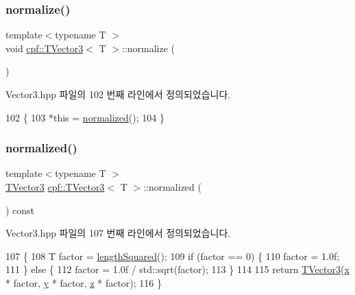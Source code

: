\subsubsection{\texorpdfstring{normalize()}{normalize()}}
{\footnotesize\ttfamily template$<$typename T $>$ \\
void \hyperlink{classcpf_1_1_t_vector3}{cpf\+::\+T\+Vector3}$<$ T $>$\+::normalize (\begin{DoxyParamCaption}{ }\end{DoxyParamCaption})\hspace{0.3cm}{\ttfamily [inline]}}



Vector3.\+hpp 파일의 102 번째 라인에서 정의되었습니다.


\begin{DoxyCode}
102                          \{
103             *\textcolor{keyword}{this} = \hyperlink{classcpf_1_1_t_vector3_a85ded1a6a9844a51b0bb5fe803857a7e}{normalized}();
104         \}
\end{DoxyCode}
\mbox{\label{classcpf_1_1_t_vector3_a85ded1a6a9844a51b0bb5fe803857a7e}} 
\subsubsection{\texorpdfstring{normalized()}{normalized()}}
{\footnotesize\ttfamily template$<$typename T $>$ \\
\hyperlink{classcpf_1_1_t_vector3}{T\+Vector3} \hyperlink{classcpf_1_1_t_vector3}{cpf\+::\+T\+Vector3}$<$ T $>$\+::normalized (\begin{DoxyParamCaption}{ }\end{DoxyParamCaption}) const\hspace{0.3cm}{\ttfamily [inline]}}



Vector3.\+hpp 파일의 107 번째 라인에서 정의되었습니다.


\begin{DoxyCode}
107                                     \{
108             T factor = \hyperlink{classcpf_1_1_t_vector3_ad8e765a30a7fcf269dc129bc458a8e58}{lengthSquared}();
109             \textcolor{keywordflow}{if} (factor == 0) \{
110                 factor = 1.0f;
111             \} \textcolor{keywordflow}{else} \{
112                 factor = 1.0f / std::sqrt(factor);
113             \}
114 
115             \textcolor{keywordflow}{return} \hyperlink{classcpf_1_1_t_vector3_a31544bebbd3d8737adf44460256b57fd}{TVector3}(\hyperlink{classcpf_1_1_t_vector3_ad3df42808358a64c518d6349ede446d8}{x} * factor, \hyperlink{classcpf_1_1_t_vector3_a2371a0583e76dcc80c6f10dd168cde1b}{y} * factor, \hyperlink{classcpf_1_1_t_vector3_ae7ea5f4b24c3438a44eb6b0fdfe02823}{z} * factor);
116         \}
\end{DoxyCode}
\mbox{\label{classcpf_1_1_t_vector3_a62c5ad92cb019a2322419e808d3ceab7}} 
